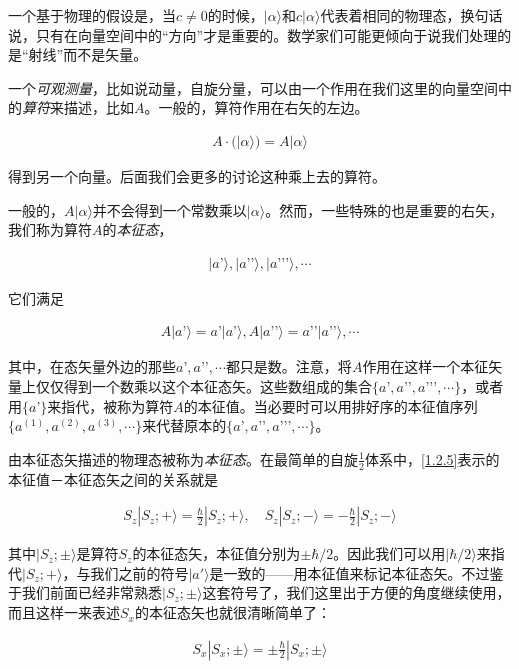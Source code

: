 \documentclass[UTF8,twoside]{ctexart}
\begin{document}
一个基于物理的假设是，当$c\neq 0$的时候，$|\alpha\rangle$和$c|\alpha\rangle$代表着相同的物理态，换句话说，只有在向量空间中的“方向”才是重要的。数学家们可能更倾向于说我们处理的是“射线”而不是矢量。

一个{\emph{可观测量}}，比如说动量，自旋分量，可以由一个作用在我们这里的向量空间中的{\emph{算符}}来描述，比如$A$。一般的，算符作用在右矢的左边。

\begin{align}
A\cdot(|\alpha\rangle) = A|\alpha\rangle
\end{align}

\noindent 得到另一个向量。后面我们会更多的讨论这种乘上去的算符。

一般的，$A|\alpha\rangle$并不会得到一个常数乘以$|\alpha\rangle$。然而，一些特殊的也是重要的右矢，我们称为算符$A$的{\emph{本征态}}，

\begin{align}
|a’\rangle,|a’’\rangle,|a’’’\rangle,\cdots
\end{align}

\noindent 它们满足

\begin{align}\label{1.2.5}
A|a’\rangle = a’|a’\rangle,A|a’’\rangle = a’’|a’’\rangle,\cdots
\end{align}

其中，在态矢量外边的那些$a’, a’’,\cdots$都只是数。注意，将$A$作用在这样一个本征矢量上仅仅得到一个数乘以这个本征态矢。这些数组成的集合$\{a’,a’’,a’’’,\cdots\}$，或者用$\{a’\}$来指代，被称为算符$A$的本征值。当必要时可以用排好序的本征值序列$\{a^{(1)},a^{(2)},a^{(3)},\cdots\}$来代替原本的$\{a’,a’’,a’’’,\cdots\}$。

由本征态矢描述的物理态被称为{\emph{本征态}}。在最简单的自旋$\frac{1}{2}$体系中，\eqref{1.2.5}表示的本征值－本征态矢之间的关系就是

\begin{align}
S_z|S_z;+\rangle = \frac{\hbar}{2}|S_z;+\rangle,\quad S_z|S_z;-\rangle = -\frac{\hbar}{2}|S_z;-\rangle
\end{align}

其中$|S_z;\pm\rangle$是算符$S_z$的本征态矢，本征值分别为$\pm\hbar/2$。因此我们可以用$|\hbar/2\rangle$来指代$|S_z;+\rangle$，与我们之前的符号$|a'\rangle$是一致的——用本征值来标记本征态矢。不过鉴于我们前面已经非常熟悉$|S_z;\pm\rangle$这套符号了，我们这里出于方便的角度继续使用，而且这样一来表述$S_x$的本征态矢也就很清晰简单了：

\begin{align}
S_x|S_x;\pm\rangle = \pm\frac{\hbar}{2}|S_x;\pm\rangle
\end{align}
\end{document}
